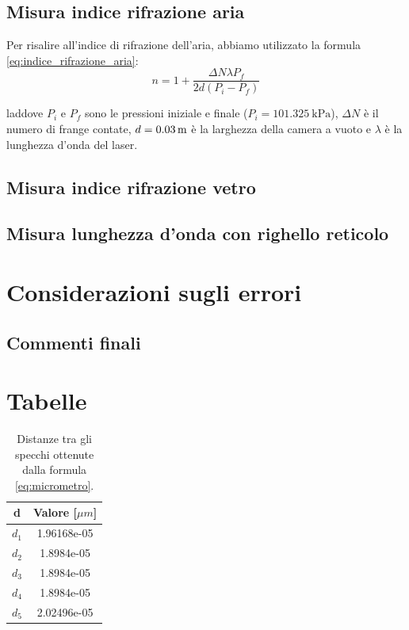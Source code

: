 \documentclass[letterpaper,12pt]{article}
\begin{document}
\subsection{Misura indice rifrazione aria}

Per risalire all'indice di rifrazione dell'aria, abbiamo utilizzato la formula \ref{eq:indice_rifrazione_aria}:
\begin{equation}
    n = 1 + \frac{\Delta N \lambda P_f}{2 d (P_i - P_f)}
    \label{eq:indice_rifrazione_aria}
\end{equation}

laddove $P_i$ e $P_f$ sono le pressioni iniziale e finale ($P_i = \SI{101.325}{\kilo\pascal}$), $\Delta N$ 
è il numero di frange contate, $d = \SI{0.03 \pm 0}{m}$ è la larghezza della camera a vuoto e $\lambda$ è la 
lunghezza d'onda del laser.

\subsection{Misura indice rifrazione vetro}



\subsection{Misura lunghezza d'onda con righello reticolo}





\section{Considerazioni sugli errori}
\label{sec:errori}

\subsection{Commenti finali}



\newpage
\section{Tabelle}


\begin{table}[h!]
    \centering
    \begin{tabular}{|c|c|}
    \hline
    \textbf{d} & \textbf{Valore} [$\mu m$] \\
    \hline
    $d_1$ & 1.96168e-05 \\
    $d_2$ & 1.8984e-05 \\
    $d_3$ & 1.8984e-05 \\
    $d_4$ & 1.8984e-05 \\
    $d_5$ & 2.02496e-05 \\
    \hline
    \end{tabular}
    \caption{Distanze tra gli specchi ottenute dalla formula \ref{eq:micrometro}.}
    \label{tab:calibrazione_micrometro_michelson}
    \end{table}
\end{document}
